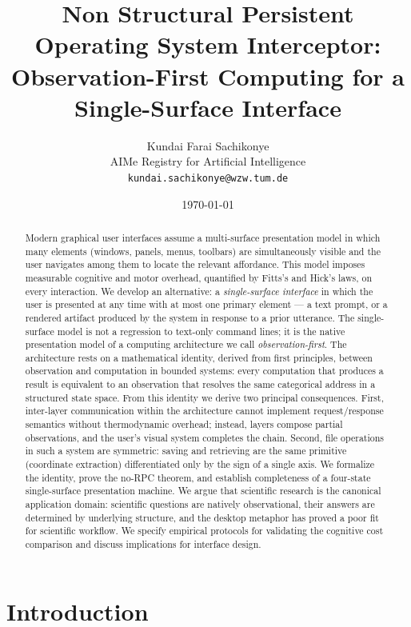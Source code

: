 \documentclass[11pt,twocolumn,a4paper]{article}
\title{Non Structural Persistent Operating System Interceptor:\\
Observation-First Computing for a Single-Surface Interface}
\author{
Kundai Farai Sachikonye\\
AIMe Registry for Artificial Intelligence\\
\texttt{kundai.sachikonye@wzw.tum.de}
}
\date{\today}
\theoremstyle{definition}
\theoremstyle{remark}
\begin{document}
\maketitle

\begin{abstract}
Modern graphical user interfaces assume a multi-surface presentation model in which many elements (windows, panels, menus, toolbars) are simultaneously visible and the user navigates among them to locate the relevant affordance. This model imposes measurable cognitive and motor overhead, quantified by Fitts's and Hick's laws, on every interaction. We develop an alternative: a \emph{single-surface interface} in which the user is presented at any time with at most one primary element --- a text prompt, or a rendered artifact produced by the system in response to a prior utterance. The single-surface model is not a regression to text-only command lines; it is the native presentation model of a computing architecture we call \emph{observation-first}. The architecture rests on a mathematical identity, derived from first principles, between observation and computation in bounded systems: every computation that produces a result is equivalent to an observation that resolves the same categorical address in a structured state space. From this identity we derive two principal consequences. First, inter-layer communication within the architecture cannot implement request/response semantics without thermodynamic overhead; instead, layers compose partial observations, and the user's visual system completes the chain. Second, file operations in such a system are symmetric: saving and retrieving are the same primitive (coordinate extraction) differentiated only by the sign of a single axis. We formalize the identity, prove the no-RPC theorem, and establish completeness of a four-state single-surface presentation machine. We argue that scientific research is the canonical application domain: scientific questions are natively observational, their answers are determined by underlying structure, and the desktop metaphor has proved a poor fit for scientific workflow. We specify empirical protocols for validating the cognitive cost comparison and discuss implications for interface design.
\end{abstract}

\section{Introduction}
\label{sec:intro}
\end{document}
